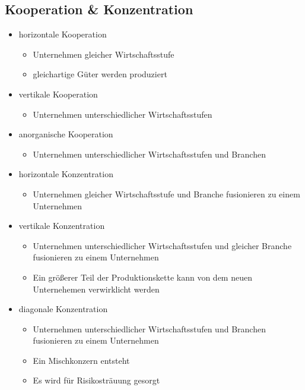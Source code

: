 \subsection{Kooperation \& Konzentration}

\begin{itemize}
	\item horizontale Kooperation
		\begin{itemize}
			\item Unternehmen gleicher Wirtschaftsstufe
			\item gleichartige Güter werden produziert
		\end{itemize}
	\item vertikale Kooperation
		\begin{itemize}
			\item Unternehmen unterschiedlicher Wirtschaftsstufen
		\end{itemize}
	\item anorganische Kooperation
		\begin{itemize}
			\item Unternehmen unterschiedlicher Wirtschaftsstufen und Branchen
		\end{itemize}
\end{itemize}

\begin{itemize}
	\item horizontale Konzentration
		\begin{itemize}
			\item Unternehmen gleicher Wirtschaftsstufe und Branche fusionieren zu einem Unternehmen
		\end{itemize}
	\item vertikale Konzentration
		\begin{itemize}
			\item Unternehmen unterschiedlicher Wirtschaftsstufen und gleicher Branche fusionieren zu einem Unternehmen
			\item Ein größerer Teil der Produktionskette kann von dem neuen Unternehemen verwirklicht werden
		\end{itemize}
	\item diagonale Konzentration
		\begin{itemize}
			\item Unternehmen unterschiedlicher Wirtschaftsstufen und Branchen fusionieren zu einem Unternehmen
			\item Ein Mischkonzern entsteht
			\item Es wird für Risikosträuung gesorgt
		\end{itemize}
\end{itemize}


